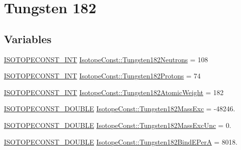 \hypertarget{group___isotope_const-_tungsten-_w182}{}\section{Tungsten 182}
\label{group___isotope_const-_tungsten-_w182}
\subsection*{Variables}
\begin{DoxyCompactItemize}
\item 
\mbox{\hyperlink{group___isotope_const-_macros_ga5f18360b3e99483a35c32d789e62621c}{I\+S\+O\+T\+O\+P\+E\+C\+O\+N\+S\+T\+\_\+\+I\+NT}} \mbox{\hyperlink{group___isotope_const-_tungsten-_w182_ga2fef17a51e4d9626e6d1497369a9e74c}{Isotope\+Const\+::\+Tungsten182\+Neutrons}} = 108
\item 
\mbox{\hyperlink{group___isotope_const-_macros_ga5f18360b3e99483a35c32d789e62621c}{I\+S\+O\+T\+O\+P\+E\+C\+O\+N\+S\+T\+\_\+\+I\+NT}} \mbox{\hyperlink{group___isotope_const-_tungsten-_w182_ga3088cbfcd3af9ebda23164fc5b37f877}{Isotope\+Const\+::\+Tungsten182\+Protons}} = 74
\item 
\mbox{\hyperlink{group___isotope_const-_macros_ga5f18360b3e99483a35c32d789e62621c}{I\+S\+O\+T\+O\+P\+E\+C\+O\+N\+S\+T\+\_\+\+I\+NT}} \mbox{\hyperlink{group___isotope_const-_tungsten-_w182_ga016c181925533ed6ed1ad327141bb5f8}{Isotope\+Const\+::\+Tungsten182\+Atomic\+Weight}} = 182
\item 
\mbox{\hyperlink{group___isotope_const-_macros_ga8f45a7272ce02c0b4c65c44636ed719a}{I\+S\+O\+T\+O\+P\+E\+C\+O\+N\+S\+T\+\_\+\+D\+O\+U\+B\+LE}} \mbox{\hyperlink{group___isotope_const-_tungsten-_w182_ga0e8343740f0d47f4fba0db1630ce6343}{Isotope\+Const\+::\+Tungsten182\+Mass\+Exc}} = -\/48246.
\item 
\mbox{\hyperlink{group___isotope_const-_macros_ga8f45a7272ce02c0b4c65c44636ed719a}{I\+S\+O\+T\+O\+P\+E\+C\+O\+N\+S\+T\+\_\+\+D\+O\+U\+B\+LE}} \mbox{\hyperlink{group___isotope_const-_tungsten-_w182_ga05d6f7e8985f03bf2cb6f5f242d294d9}{Isotope\+Const\+::\+Tungsten182\+Mass\+Exc\+Unc}} = 0.
\item 
\mbox{\hyperlink{group___isotope_const-_macros_ga8f45a7272ce02c0b4c65c44636ed719a}{I\+S\+O\+T\+O\+P\+E\+C\+O\+N\+S\+T\+\_\+\+D\+O\+U\+B\+LE}} \mbox{\hyperlink{group___isotope_const-_tungsten-_w182_ga914cd70841bb0cbdd6b5fb3cea4de7de}{Isotope\+Const\+::\+Tungsten182\+Bind\+E\+PerA}} = 8018.
\item 

\end{DoxyCompactItemize}
